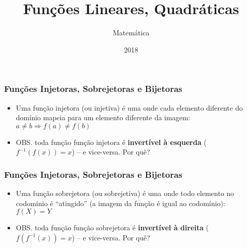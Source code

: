 \documentclass[usenames,dvipsnames,svgnames]{beamer}
\title{Funções Lineares, Quadráticas}
\author{Matemática}
\institute{ONGEP}
\date{2018}
\begin{document}
\frame{\titlepage}

\begin{frame}	
	\frametitle{Funções Injetoras, Sobrejetoras e Bijetoras}

	\begin{itemize}
		\item Uma função injetora (ou injetiva) é uma onde cada elemento diferente do domínio mapeia para um elemento diferente da imagem: $a \neq b \Rightarrow f(a) \neq f(b)$
		\item OBS. toda função função injetora é \textbf{invertível à esquerda} ($f^{-1}(f(x)) = x$) -- e vice-versa. Por quê?
	\end{itemize}

	\begin{adjustbox}{max totalsize={\textwidth}{.65\textheight},center}
	\end{adjustbox}
\end{frame}

\begin{frame}	
	\frametitle{Funções Injetoras, Sobrejetoras e Bijetoras}

	\begin{itemize}
		\item Uma função sobrejetora (ou sobrejetiva) é uma onde todo elemento no codomínio é ``atingido'' (a imagem da função é igual ao codomínio): $f(X) = Y$
		\item OBS. toda função função sobrejetora é \textbf{invertível à direita} ($f(f^{-1}(x)) = x$) -- e vice-versa. Por quê?
	\end{itemize}

	\begin{adjustbox}{max totalsize={\textwidth}{.65\textheight},center}
	\end{adjustbox}
\end{frame}
\end{document}

